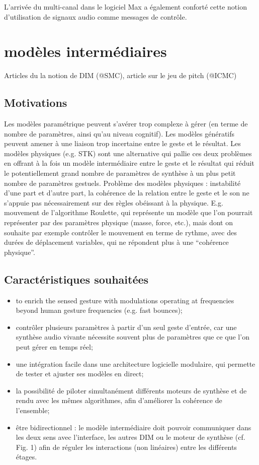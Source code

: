 L'arrivée du multi-canal dans le logiciel Max a également conforté cette notion d'utilisation de signaux audio comme messages de contrôle.


\section{modèles intermédiaires}
\label{sec:algorithms:MID}
Articles du la notion de DIM (@SMC), article sur le jeu de pitch (@ICMC)

\subsection{Motivations}
Les modèles paramétrique peuvent s'avérer trop complexe à gérer (en terme de nombre de paramètres, ainsi qu'au niveau cognitif). Les modèles génératifs peuvent amener à une liaison trop incertaine entre le geste et le résultat. Les modèles physiques (e.g. \gls{STK}) sont une alternative qui pallie ces deux problèmes en offrant à la fois un modèle intermédiaire entre le geste et le résultat qui réduit le potentiellement grand nombre de paramètres de synthèse à un plus petit nombre de paramètres gestuels. 
Problème des modèles physiques : instabilité d'une part et d'autre part, la cohérence de la relation entre le geste et le son ne s'appuie pas nécessairement sur des règles obéissant à la physique. 
E.g. mouvement de l'algorithme Roulette, qui représente un modèle que l'on pourrait représenter par des paramètres physique (masse, force, etc.), mais dont on souhaite par exemple contrôler le mouvement en terme de rythme, avec des durées de déplacement variables, qui ne répondent plus à une ``cohérence physique''.

\subsection{Caractéristiques souhaitées}
\vspace{-1em}
\begin{itemize}[noitemsep]
	\item to enrich the sensed gesture with modulations operating at frequencies beyond human gesture frequencies (e.g. fast bounces);
	\item contrôler plusieurs paramètres à partir d'un seul geste d'entrée, car une synthèse audio vivante nécessite souvent plus de paramètres que ce que l'on peut gérer en temps réel;
	\item une intégration facile dans une architecture logicielle modulaire, qui permette de tester et ajuster ses modèles en direct;
	\item la possibilité de piloter simultanément différents moteurs de synthèse et de rendu avec les mêmes algorithmes, afin d'améliorer la cohérence de l'ensemble;
	\item être bidirectionnel : le modèle intermédiaire doit pouvoir communiquer dans les deux sens avec l'interface, les autres DIM ou le moteur de synthèse (cf. Fig. 1) afin de réguler les interactions (non linéaires) entre les différents étages.
\end{itemize}

